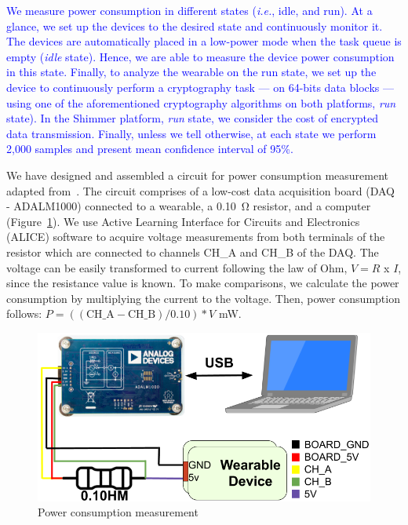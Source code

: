 \documentclass[journal]{IEEEtran}
\newcommand{\rever}{\textcolor{blue}}
\begin{document}
\rever{We measure power consumption in different states ({\em i.e.}, idle, and run). At a glance, we set up the devices to the desired state and continuously monitor it. The devices are automatically placed in a low-power mode when the task queue is empty (\textit{idle} state). Hence, we are able to measure the device power consumption in this state. Finally, to analyze the wearable on the run state, we set up the device to continuously perform a cryptography task --- on 64-bits data blocks --- using one of the aforementioned cryptography algorithms on both platforms, {\em run} state). In the Shimmer platform, {\em run} state, we consider the cost of encrypted data transmission. Finally, unless we tell otherwise, at each state we perform 2,000 samples and present mean confidence interval of 95\%.}


We have designed and assembled a circuit for power consumption measurement adapted from~\cite{bessa2017jetsonleap}. The circuit comprises of a low-cost data acquisition board (DAQ - ADALM1000) connected to a wearable, a 0.10~\si{\ohm} resistor, and a computer (Figure~\ref{fig:circuit}). We use Active Learning Interface for Circuits and Electronics (ALICE) software to acquire voltage measurements from both terminals of the resistor which are connected to channels CH\_A and CH\_B of the DAQ. The voltage can be easily transformed to current following the law of Ohm, $V = R$ x $I$, since the resistance value is known. 
To make comparisons, we calculate the power consumption by multiplying the current to the voltage. Then, power consumption follows: 
$P = ((\mbox{CH\_A} - \mbox{CH\_B}) / 0.10) * V $ mW.

\begin{figure}[!htb]
 \vspace{-0.3cm}
 \centering
 \includegraphics[scale=0.19]{Figures/circuit.png}
 \caption{Power consumption measurement}
 \label{fig:circuit}
 \vspace{-0.3cm}
\end{figure}
\end{document}
